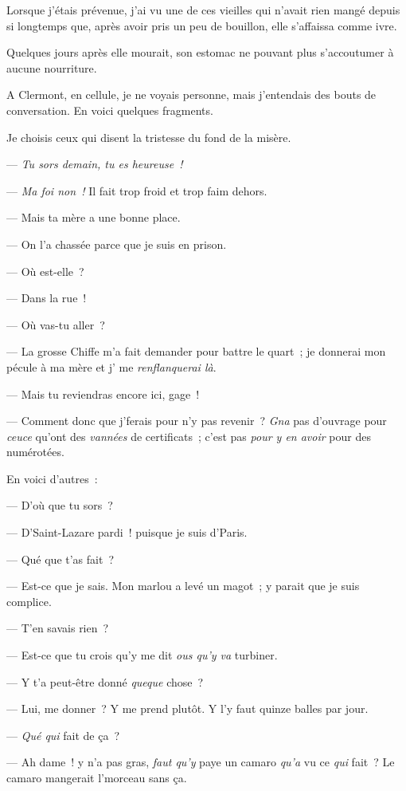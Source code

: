 \documentclass[french,twoside]{book} %
\begin{document}
Lorsque j’étais prévenue, j’ai vu une de ces vieilles qui n’avait rien mangé depuis si longtemps que, après avoir pris un peu de bouillon, elle s’affaissa comme ivre.\par
Quelques jours après elle mourait, son estomac ne pouvant plus s’accoutumer à aucune nourriture.\par
A Clermont, en cellule, je ne voyais personne,  mais j’entendais des bouts de conversation. En voici quelques fragments.\par
Je choisis ceux qui disent la tristesse du fond de la misère.\par
\bigbreak
\noindent — \emph{Tu sors demain, tu es heureuse !}\par
— \emph{Ma foi non !} Il fait trop froid et trop faim dehors.\par
— Mais ta mère a une bonne place.\par
— On l’a chassée parce que je suis en prison.\par
— Où est-elle ?\par
— Dans la rue !\par
— Où vas-tu aller ?\par
— La grosse Chiffe m’a fait demander pour battre le quart ; je donnerai mon pécule à ma mère et j’ me \emph{renflanquerai là}.\par
— Mais tu reviendras encore ici, gage !\par
— Comment donc que j’ferais pour n’y pas revenir ? \emph{Gna} pas d’ouvrage pour \emph{ceuce} qu’ont des \emph{vannées} de certificats ; c’est pas \emph{pour y en avoir} pour des numérotées.\par
\bigbreak
\noindent En voici d’autres :\par
\bigbreak
\noindent — D’où que tu sors ?\par
— D’Saint-Lazare pardi ! puisque je suis d’Paris.\par
— Qué que t’as fait ?\par
 — Est-ce que je sais. Mon marlou a levé un magot ; y parait que je suis complice.\par
— T’en savais rien ?\par
— Est-ce que tu crois qu’y me dit \emph{ous qu’y va} turbiner.\par
— Y t’a peut-être donné \emph{queque} chose ?\par
— Lui, me donner ? Y me prend plutôt. Y l’y faut quinze balles par jour.\par
— \emph{Qué qui} fait de ça ?\par
— Ah dame ! y n’a pas gras, \emph{faut qu’y} paye un camaro \emph{qu’a} vu ce \emph{qui} fait ? Le camaro mangerait l’morceau sans ça.\par
\end{document}
